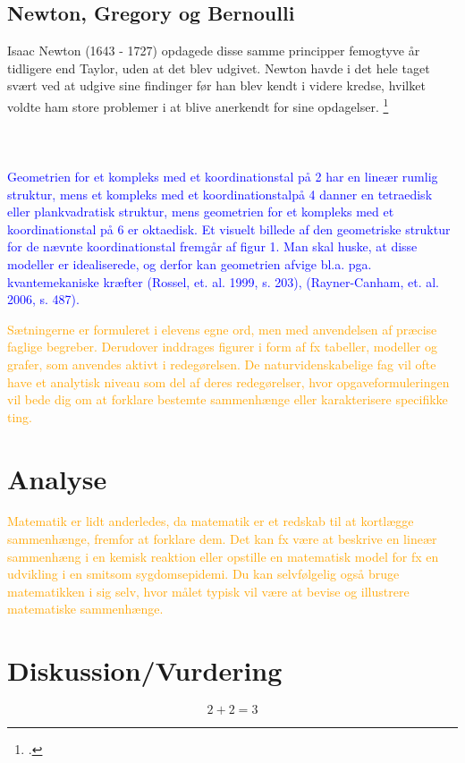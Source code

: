\documentclass[12pt, a4paper]{article}
\begin{document}
\subsection{Newton, Gregory og Bernoulli}

Isaac Newton (1643 - 1727) opdagede disse samme principper femogtyve år tidligere end Taylor, uden at det blev udgivet. Newton havde i det hele taget svært ved at udgive sine findinger før han blev kendt i videre kredse, hvilket voldte ham store problemer i at blive anerkendt for sine opdagelser. \footcite{uendeligerækker}\\
\\
\\
\\
\textcolor{blue}{Geometrien for et kompleks med et koordinationstal på 2 har en lineær rumlig struktur, mens et kompleks med et koordinationstalpå 4 danner en tetraedisk eller plankvadratisk struktur, mens geometrien for et kompleks med et koordinationstal på 6 er oktaedisk. Et visuelt billede af den geometriske struktur for de nævnte koordinationstal fremgår af figur 1. Man skal huske, at disse modeller er idealiserede, og derfor kan geometrien afvige bl.a. pga. kvantemekaniske kræfter (Rossel, et. al. 1999, s. 203), (Rayner-Canham, et. al. 2006, s. 487).}

\textcolor{orange}{Sætningerne er formuleret i elevens egne ord, men med anvendelsen af præcise faglige begreber. Derudover inddrages figurer i form af fx tabeller, modeller og grafer, som anvendes aktivt i redegørelsen.
    De naturvidenskabelige fag vil ofte have et analytisk niveau som del af deres redegørelser, hvor opgaveformuleringen vil bede dig om at forklare bestemte sammenhænge eller karakterisere specifikke ting.}
\section{Analyse} %
\textcolor{orange}{Matematik er lidt anderledes, da matematik er et redskab til at kortlægge sammenhænge, fremfor at forklare dem. Det kan fx være at beskrive en lineær sammenhæng i en kemisk reaktion eller opstille en matematisk model for fx en udvikling i en smitsom sygdomsepidemi.  Du kan selvfølgelig også bruge matematikken i sig selv, hvor målet typisk vil være at bevise og illustrere matematiske sammenhænge.}
\section{Diskussion/Vurdering} %
\begin{equation}
    2+2=3
\end{equation}
\end{document}
